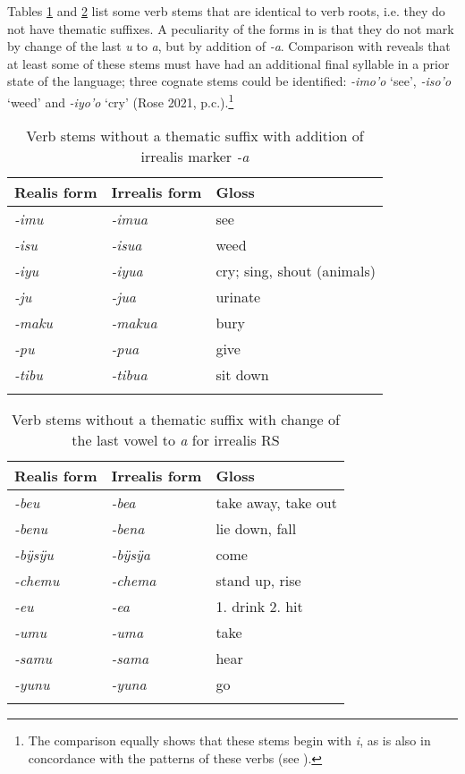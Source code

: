 Tables \ref{table:BareVerbStems1} and \ref{table:BareVerbStems2} list some verb stems that are identical to verb roots, i.e. they do not have thematic suffixes. A peculiarity of the forms in  is that they do not mark  by change of the last \textit{u} to \textit{a}, but by addition of \textit{-a}. Comparison with  reveals that at least some of these stems must have had an additional final syllable in a prior state of the language; three cognate stems could be identified: \textit{-imo’o} ‘see’, \textit{-iso’o} ‘weed’ and \textit{-iyo’o} ‘cry’ (Rose 2021, p.c.).\footnote{The comparison equally shows that these stems begin with \textit{i}, as is also in concordance with the  patterns of these verbs (see ).}

\begin{table}
\caption{Verb stems without a thematic suffix with addition of irrealis marker \textit{-a}}

\begin{tabular}{lll}
\lsptoprule
Realis form & Irrealis form & Gloss \\
\midrule
\textit{-imu} & \textit{-imua} & see \\
\textit{-isu} & \textit{-isua} & weed \\
\textit{-iyu} & \textit{-iyua} & cry; sing, shout (animals) \\
\textit{-ju} & \textit{-jua} & urinate\\
\textit{-maku} & \textit{-makua} & bury\\
\textit{-pu} & \textit{-pua} & give \\
\textit{-tibu} & \textit{-tibua} & sit down \\
\lspbottomrule
\end{tabular}

\label{table:BareVerbStems1}
\end{table}

\begin{table}
\caption{Verb stems without a thematic suffix with change of the last vowel to \textit{a} for irrealis RS}

\begin{tabular}{lll}
\lsptoprule
Realis form & Irrealis form & Gloss \\
\midrule
\textit{-beu} & \textit{-bea} & take away, take out \\
\textit{-benu} & \textit{-bena} & lie down, fall \\
\textit{-bÿsÿu} & \textit{-bÿsÿa} & come \\
\textit{-chemu} & \textit{-chema} & stand up, rise \\
\textit{-eu} & \textit{-ea} & 1. drink 2. hit \\
\textit{-umu} & \textit{-uma} & take \\
\textit{-samu} & \textit{-sama} & hear \\
\textit{-yunu} & \textit{-yuna} & go \\
\lspbottomrule
\end{tabular}

\label{table:BareVerbStems2}
\end{table}


